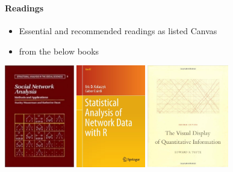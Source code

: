 \documentclass[8pt]{beamer}
\begin{document}

\begin{frame}
\frametitle{\insertsection}
\framesubtitle{Readings}

\begin{itemize}
	\item Essential and recommended readings as listed Canvas
	\item {\color{blue}{Selected chapters}} from the below books
\end{itemize}
\medskip
\medskip

\centering
\includegraphics[height=4.5cm, frame]{wassermancover}\hspace{0.5cm}
\includegraphics[height=4.5cm, frame]{igraphcover}\hspace{0.5cm}
\includegraphics[height=4.5cm, frame]{tufte}
\end{frame}

\end{document}
